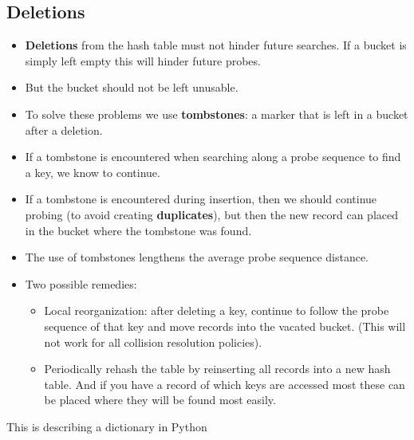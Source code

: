 \documentclass{article}[18pt]
\begin{document}
\subsection{Deletions}
\begin{itemize}
\item \textbf{Deletions} from the hash table must not hinder future
searches. If a bucket is simply left empty this will hinder
future probes.
\item But the bucket should not be left unusable.
\item To solve these problems we use \textbf{tombstones}: a marker that
is left in a bucket after a deletion.
\item If a tombstone is encountered when searching along a
probe sequence to find a key, we know to continue.
\item If a tombstone is encountered during insertion, then we
should continue probing (to avoid creating \textbf{duplicates}), but
then the new record can placed in the bucket where the
tombstone was found.
\item The use of tombstones lengthens the average probe
sequence distance.
\item Two possible remedies:
\begin{itemize}
\item Local reorganization: after deleting a key, continue to follow
the probe sequence of that key and move records into the
vacated bucket. (This will not work for all collision resolution
policies).
\item Periodically rehash the table by reinserting all records into a
new hash table. And if you have a record of which keys are
accessed most these can be placed where they will be
found most easily.
\end{itemize}

\end{itemize}
This is describing a dictionary in Python
\end{document}
